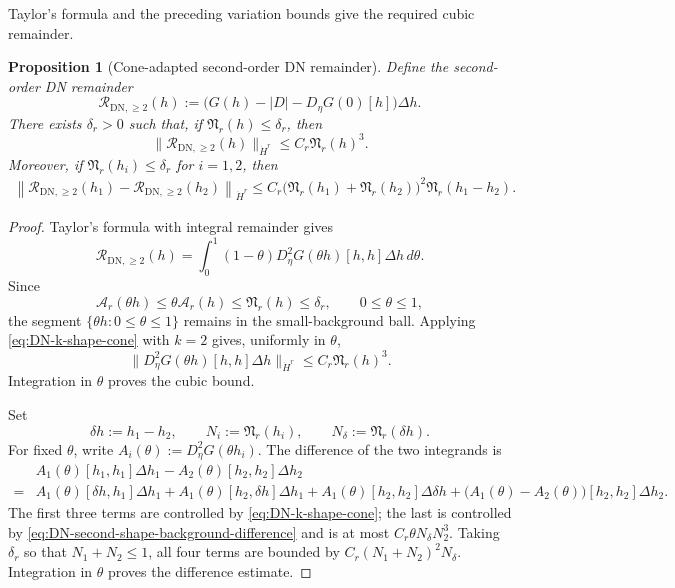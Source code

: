 \documentclass[12pt]{amsart}
\newtheorem{proposition}[theorem]{Proposition}
\theoremstyle{remark}
\theoremstyle{definition}
\numberwithin{equation}{section}
\begin{document}
Taylor's formula and the preceding variation bounds give the required
cubic remainder.

\begin{proposition}[Cone-adapted second-order DN remainder]
\label{prop:DN-second-remainder-revised}
Define the second-order DN remainder
\[
 \mathcal R_{\mathrm{DN},\geq2}(h) := \bigl( G(h)-|D|-D_\eta G(0)[h] \bigr)\Delta h.
\]
There exists \(\delta_r>0\) such that, if
\(\mathfrak N_r(h)\leq\delta_r\), then
\begin{equation*}
 \|\mathcal R_{\mathrm{DN},\geq2}(h)\|_{\dot H^r} \leq C_r\mathfrak N_r(h)^3.
\end{equation*}
Moreover, if \(\mathfrak N_r(h_i)\leq\delta_r\) for \(i=1,2\), then
\begin{align*}
 \left\| \mathcal R_{\mathrm{DN},\geq2}(h_1) - \mathcal R_{\mathrm{DN},\geq2}(h_2) \right\|_{\dot H^r}\leq C_r \bigl( \mathfrak N_r(h_1)+\mathfrak N_r(h_2) \bigr)^2 \mathfrak N_r(h_1-h_2).
\end{align*}
\end{proposition}

\begin{proof}
Taylor's formula with integral remainder gives
\begin{equation*}
 \mathcal R_{\mathrm{DN},\geq2}(h) = \int_0^1 (1-\theta) D_\eta^2G(\theta h)[h,h]\Delta h \,d\theta.
\end{equation*}
Since
\[
 \mathcal A_r(\theta h) \leq \theta\mathcal A_r(h) \leq
 \mathfrak N_r(h) \leq \delta_r,
 \qquad 0\leq\theta\leq1,
\]
the segment \(\{\theta h:0\leq\theta\leq1\}\) remains in the
small-background ball. Applying
\eqref{eq:DN-k-shape-cone} with \(k=2\) gives, uniformly in
\(\theta\),
\[
 \bigl\|
  D_\eta^2G(\theta h)[h,h]\Delta h
 \bigr\|_{\dot H^r} \leq C_r\mathfrak N_r(h)^3.
\]
Integration in \(\theta\) proves the cubic bound.

Set
\[
 \delta h:=h_1-h_2, \qquad N_i:=\mathfrak N_r(h_i), \qquad N_\delta:=\mathfrak N_r(\delta h).
\]
For fixed \(\theta\), write \(A_i(\theta):=D_\eta^2G(\theta h_i)\).
The difference of the two integrands is
\begin{align*}
 &A_1(\theta)[h_1,h_1]\Delta h_1 - A_2(\theta)[h_2,h_2]\Delta h_2\\
 =& A_1(\theta)[\delta h,h_1]\Delta h_1 + A_1(\theta)[h_2,\delta h]\Delta h_1+ A_1(\theta)[h_2,h_2]\Delta\delta h + \bigl(A_1(\theta)-A_2(\theta)\bigr) [h_2,h_2]\Delta h_2.
\end{align*}
The first three terms are controlled by \eqref{eq:DN-k-shape-cone}; the last is controlled by \eqref{eq:DN-second-shape-background-difference} and
is at most \(C_r\theta N_\delta N_2^3\).  
Taking \(\delta_r\) so that \(N_1+N_2\leq1\), all four terms are bounded by
\(C_r(N_1+N_2)^2N_\delta\).  
Integration in \(\theta\) proves the difference estimate.
\end{proof}
\end{document}
